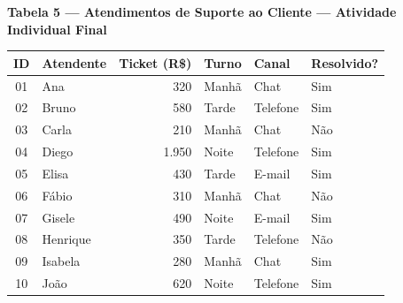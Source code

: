 \begin{BoardBox}
\textbf{Tabela 5 — Atendimentos de Suporte ao Cliente — Atividade Individual Final}

\medskip
\begin{tabular}{|c|l|r|l|l|l|}
\hline
\textbf{ID} & \textbf{Atendente} & \textbf{Ticket (R\$)} & \textbf{Turno} & \textbf{Canal} & \textbf{Resolvido?} \\
\hline
01 & Ana       &  320 & Manhã  & Chat     & Sim \\
02 & Bruno     &  580 & Tarde  & Telefone & Sim \\
03 & Carla     &  210 & Manhã  & Chat     & Não \\
04 & Diego     & 1.950 & Noite & Telefone & Sim \\
05 & Elisa     &  430 & Tarde  & E-mail   & Sim \\
06 & Fábio     &  310 & Manhã  & Chat     & Não \\
07 & Gisele    &  490 & Noite  & E-mail   & Sim \\
08 & Henrique  &  350 & Tarde  & Telefone & Não \\
09 & Isabela   &  280 & Manhã  & Chat     & Sim \\
10 & João      &  620 & Noite  & Telefone & Sim \\
\hline
\end{tabular}
\end{BoardBox}


